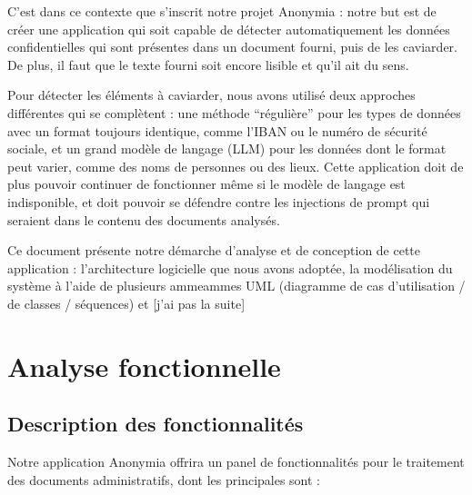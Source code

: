 \documentclass[12pt,a4paper]{article}
\begin{document}
C’est dans ce contexte que s’inscrit notre projet Anonymia : notre but est de créer une application qui soit capable de détecter automatiquement les données confidentielles qui sont présentes dans un document fourni, puis de les caviarder. De plus, il faut que le texte fourni soit encore lisible et qu’il ait du sens.
\newline

Pour détecter les éléments à caviarder, nous avons utilisé deux approches différentes qui se complètent : une méthode “régulière” pour les types de données avec un format toujours identique, comme l’IBAN ou le numéro de sécurité sociale, et un grand modèle de langage (LLM) pour les données dont le format peut varier, comme des noms de personnes ou des lieux. Cette application doit de plus pouvoir continuer de fonctionner même si le modèle de langage est indisponible, et doit pouvoir se défendre contre les injections de prompt qui seraient dans le contenu des documents analysés.
\newline

Ce document présente notre démarche d’analyse et de conception de cette application : l’architecture logicielle que nous avons adoptée, la modélisation du système à l’aide de plusieurs ammeammes UML (diagramme de cas d’utilisation / de classes / séquences) et [j’ai pas la suite]



\section{Analyse fonctionnelle}
\subsection{Description des fonctionnalités}

Notre application Anonymia offrira un panel de fonctionnalités pour le traitement des documents administratifs, dont les principales sont :
\end{document}
